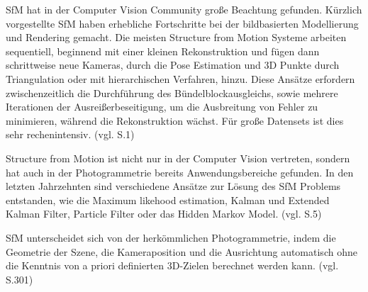 SfM hat in der Computer Vision Community große Beachtung gefunden. Kürzlich vorgestellte SfM haben erhebliche Fortschritte bei der bildbasierten Modellierung und Rendering gemacht. Die meisten Structure from Motion Systeme arbeiten sequentiell, beginnend mit einer kleinen Rekonstruktion und fügen dann schrittweise neue Kameras, durch die Pose Estimation und 3D Punkte durch Triangulation oder mit hierarchischen Verfahren, hinzu. Diese Ansätze erfordern zwischenzeitlich die Durchführung des Bündelblockausgleichs, sowie mehrere Iterationen der Ausreißerbeseitigung, um die Ausbreitung von Fehler zu minimieren, während die Rekonstruktion wächst. Für große Datensets ist dies sehr rechenintensiv. (vgl. \cite{sfm} S.1)

Structure from Motion ist nicht nur in der Computer Vision vertreten, sondern hat auch in der Photogrammetrie bereits Anwendungsbereiche gefunden. In den letzten Jahrzehnten sind verschiedene Ansätze zur Lösung des SfM Problems entstanden, wie die \glqq Maximum likehood estimation\grqq{}, \glqq Kalman und Extended Kalman Filter\grqq{}, \glqq Particle Filter\grqq{} oder das \glqq Hidden Markov Model\grqq{}. (vgl. \cite{efficient_bundle} S.5)

SfM unterscheidet sich von der herkömmlichen Photogrammetrie, indem die Geometrie der Szene, die Kameraposition und die Ausrichtung automatisch ohne die Kenntnis von a priori definierten 3D-Zielen berechnet werden kann. (vgl. \cite{sfm_photo} S.301)
